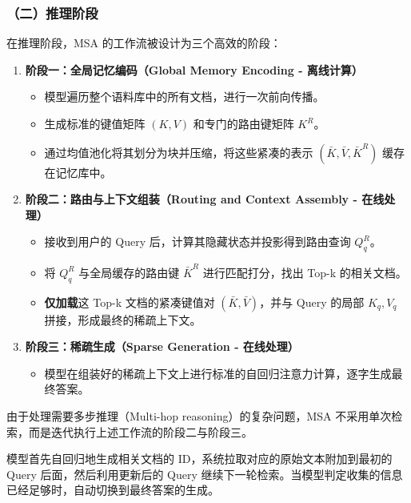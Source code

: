 \hypertarget{ux4e8cux63a8ux7406ux9636ux6bb5}{%
\subsubsection{（二）推理阶段}\label{ux4e8cux63a8ux7406ux9636ux6bb5}}

在推理阶段，MSA 的工作流被设计为三个高效的阶段：

\begin{enumerate}
\def\labelenumi{\arabic{enumi}.}
\tightlist
\item
  \textbf{阶段一：全局记忆编码（Global Memory Encoding - 离线计算）}

  \begin{itemize}
  \tightlist
  \item
    模型遍历整个语料库中的所有文档，进行一次前向传播。
  \item
    生成标准的键值矩阵 \((K,V)\) 和专门的路由键矩阵 \(K^R\)。
  \item
    通过均值池化将其划分为块并压缩，将这些紧凑的表示 \((\bar{K},\bar{V},\bar{K}^R)\) 缓存在记忆库中。
  \end{itemize}
\item
  \textbf{阶段二：路由与上下文组装（Routing and Context Assembly - 在线处理）}

  \begin{itemize}
  \tightlist
  \item
    接收到用户的 Query 后，计算其隐藏状态并投影得到路由查询 \(Q_q^R\)。
  \item
    将 \(Q_q^R\) 与全局缓存的路由键 \(\bar{K}^R\) 进行匹配打分，找出 Top-k 的相关文档。
  \item
    \textbf{仅加载}这 Top-k 文档的紧凑键值对 \((\bar{K},\bar{V})\)，并与 Query 的局部 \(K_q,V_q\) 拼接，形成最终的稀疏上下文。
  \end{itemize}
\item
  \textbf{阶段三：稀疏生成（Sparse Generation - 在线处理）}

  \begin{itemize}
  \tightlist
  \item
    模型在组装好的稀疏上下文上进行标准的自回归注意力计算，逐字生成最终答案。
  \end{itemize}
\end{enumerate}

由于处理需要多步推理（Multi-hop reasoning）的复杂问题，MSA 不采用单次检索，而是迭代执行上述工作流的阶段二与阶段三。

模型首先自回归地生成相关文档的 ID，系统拉取对应的原始文本附加到最初的 Query 后面，然后利用更新后的 Query 继续下一轮检索。当模型判定收集的信息已经足够时，自动切换到最终答案的生成。

